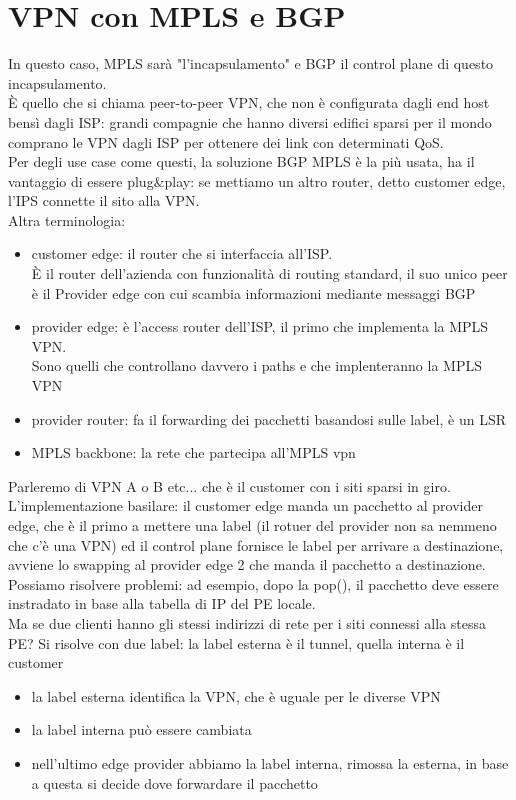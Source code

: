 \documentclass[12pt, oneside]{extbook} %
\begin{document}
\section{VPN con MPLS e BGP}
In questo caso, MPLS sarà "l'incapsulamento" e BGP il control plane di questo incapsulamento.
\\È quello che si chiama peer-to-peer VPN, che non è configurata dagli end host bensì dagli ISP: grandi compagnie che hanno diversi edifici sparsi per il mondo comprano le VPN dagli ISP per ottenere dei link con determinati QoS.
\\Per degli use case come questi, la soluzione BGP MPLS è la più usata, ha il vantaggio di essere plug\&play: se mettiamo un altro router, detto customer edge, l'IPS connette il sito alla VPN.
\\ Altra terminologia:
\begin{itemize}
    \item customer edge: il router che si interfaccia all'ISP.
    \\È il router dell'azienda con funzionalità di routing standard, il suo unico peer è il Provider edge con cui scambia informazioni mediante messaggi BGP
    \item provider edge: è l'access router dell'ISP, il primo che implementa la MPLS VPN.
    \\Sono quelli che controllano davvero i paths e che implenteranno la MPLS VPN
    \item provider router: fa il forwarding dei pacchetti basandosi sulle label, è un LSR
    \item MPLS backbone: la rete che partecipa all'MPLS vpn
\end{itemize}
Parleremo di VPN A o B etc... che è il customer con i siti sparsi in giro.
\\L'implementazione basilare: il customer edge manda un pacchetto al provider edge, che è il primo a mettere una label (il rotuer del provider non sa nemmeno che c'è una VPN) ed il control plane fornisce le label per arrivare a destinazione, avviene lo swapping al provider edge 2 che manda il pacchetto a destinazione.
\\Possiamo risolvere problemi: ad esempio, dopo la pop(), il pacchetto deve essere instradato in base alla tabella di IP del PE locale.
\\Ma se due clienti hanno gli stessi indirizzi di rete per i siti connessi alla stessa PE?
Si risolve con due label: la label esterna è il tunnel, quella interna è il customer
\begin{itemize}
    \item la label esterna identifica la VPN, che è uguale per le diverse VPN
    \item la label interna può essere cambiata
    \item nell'ultimo edge provider abbiamo la label interna, rimossa la esterna, in base a questa si decide dove forwardare il pacchetto
\end{itemize}
\end{document}
